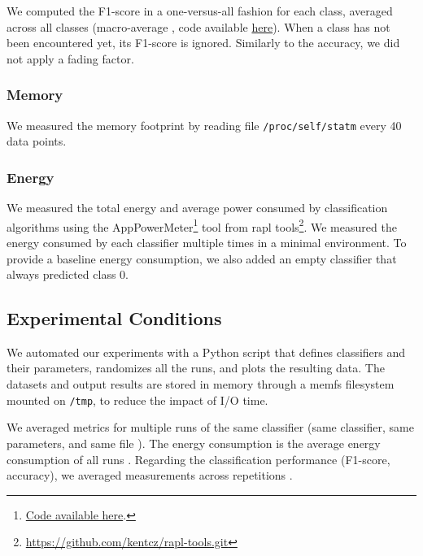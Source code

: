 We computed the
F1-score in a one-versus-all fashion for each class, averaged across all classes
(macro-average , code available \href{https://github.com/azazel7/paper-benchmark/blob/9adb1039c5a65a00a66d554f0e870d14d3fff7cb/main.cpp\#L82}{here}).  When a class has not been encountered yet, its F1-score is ignored.
Similarly to the accuracy, we did not apply a fading factor.

\subsubsection{Memory}
We measured the memory footprint by reading file \texttt{/proc/self/statm} every 40 data points.

\subsubsection{Energy}
We measured the total energy and average power consumed by classification
algorithms using the
AppPowerMeter\footnote{\href{https://github.com/azazel7/paper-benchmark/blob/9adb1039c5a65a00a66d554f0e870d14d3fff7cb/makefile.py\#L122}{Code
available here}.} tool from rapl
tools\footnote{\url{https://github.com/kentcz/rapl-tools.git}}. We measured
the energy consumed by each classifier multiple times in a minimal
environment. To provide a baseline energy consumption, we also added an
empty classifier that always predicted class 0.

\subsection{Experimental Conditions}
We automated our experiments with a Python script that defines
classifiers and their parameters, randomizes all the runs, and plots the
resulting data. The datasets and output results are stored in memory
through a memfs filesystem mounted on \texttt{/tmp}, to reduce the impact of I/O time.

We averaged metrics for multiple runs of the same
classifier (same classifier, same parameters, and same file ). The energy
consumption is the average energy consumption of all runs . Regarding the
classification performance (F1-score, accuracy), we averaged measurements
across repetitions .


